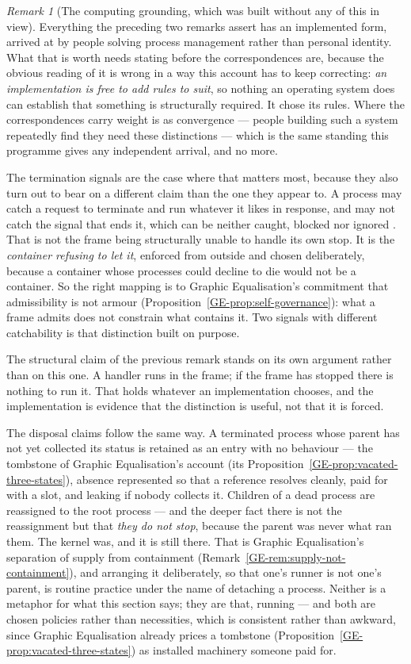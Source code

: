 \documentclass[11pt,a4paper]{article}
\theoremstyle{remark}\newtheorem{remark}[definition]{Remark}
\begin{document}
\begin{remark}[The computing grounding, which was built without any of this in view]\label{rem:death-computing}
Everything the preceding two remarks assert has an implemented form, arrived at by people solving
process management rather than personal identity. What that is worth needs stating before the
correspondences are, because the obvious reading of it is wrong in a way this account has to keep
correcting: \emph{an implementation is free to add rules to suit}, so nothing an operating system does
can establish that something is structurally required. It chose its rules. Where the correspondences
carry weight is as convergence --- people building such a system repeatedly find they need these
distinctions --- which is the same standing this programme gives any independent arrival, and no more.

The termination signals are the case where that matters most, because they also turn out to bear on a
different claim than the one they appear to. A process may catch a request to terminate and run
whatever it likes in response, and may not catch the signal that ends it, which can be neither caught,
blocked nor ignored \citep{posix2017}. That is not the frame being structurally unable to handle its
own stop. It is the \emph{container refusing to let it}, enforced from outside and chosen deliberately,
because a container whose processes could decline to die would not be a container. So the right mapping
is to Graphic Equalisation's commitment that admissibility is not armour
(Proposition~\ref{GE-prop:self-governance}): what a frame admits does not
constrain what contains it. Two signals with different catchability is that distinction built on
purpose.

The structural claim of the previous remark stands on its own argument rather than on this one. A
handler runs in the frame; if the frame has stopped there is nothing to run it. That holds whatever an
implementation chooses, and the implementation is evidence that the distinction is useful, not that it
is forced.

The disposal claims follow the same way. A terminated process whose parent has not yet collected its
status is retained as an entry with no behaviour --- the tombstone of Graphic
Equalisation's account (its Proposition~\ref{GE-prop:vacated-three-states}),
absence represented so that a reference resolves cleanly, paid for with a slot, and leaking if nobody
collects it. Children of a dead process are reassigned to the root process --- and the
deeper fact there is not the reassignment but that \emph{they do not stop}, because the parent was
never what ran them. The kernel was, and it is still there. That is Graphic Equalisation's separation of
supply from containment (Remark~\ref{GE-rem:supply-not-containment}), and arranging it deliberately, so that one's runner is not one's parent, is
routine practice under the name of detaching a process. Neither is a metaphor for what this section
says; they are that, running --- and both are chosen policies rather than necessities, which is
consistent rather than awkward, since Graphic Equalisation already prices a tombstone
(Proposition~\ref{GE-prop:vacated-three-states}) as installed
machinery someone paid for.


\end{remark}
\end{document}

